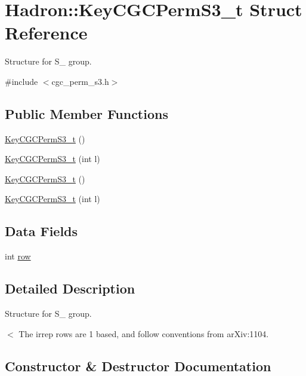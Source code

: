 \hypertarget{structHadron_1_1KeyCGCPermS3__t}{}\section{Hadron\+:\+:Key\+C\+G\+C\+Perm\+S3\+\_\+t Struct Reference}
\label{structHadron_1_1KeyCGCPermS3__t}


Structure for S\+\_ group.  




{\ttfamily \#include $<$cgc\+\_\+perm\+\_\+s3.\+h$>$}

\subsection*{Public Member Functions}
\begin{DoxyCompactItemize}
\item 
\mbox{\hyperlink{structHadron_1_1KeyCGCPermS3__t_a7d9a9f27c0bc478ff41dbdc47deee19e}{Key\+C\+G\+C\+Perm\+S3\+\_\+t}} ()
\item 
\mbox{\hyperlink{structHadron_1_1KeyCGCPermS3__t_af58d8b287b6da4b7998735e67be0f1f9}{Key\+C\+G\+C\+Perm\+S3\+\_\+t}} (int l)
\item 
\mbox{\hyperlink{structHadron_1_1KeyCGCPermS3__t_a7d9a9f27c0bc478ff41dbdc47deee19e}{Key\+C\+G\+C\+Perm\+S3\+\_\+t}} ()
\item 
\mbox{\hyperlink{structHadron_1_1KeyCGCPermS3__t_af58d8b287b6da4b7998735e67be0f1f9}{Key\+C\+G\+C\+Perm\+S3\+\_\+t}} (int l)
\end{DoxyCompactItemize}
\subsection*{Data Fields}
\begin{DoxyCompactItemize}
\item 
int \mbox{\hyperlink{structHadron_1_1KeyCGCPermS3__t_ae42674e0246b466965e187a7210cd8e2}{row}}
\end{DoxyCompactItemize}


\subsection{Detailed Description}
Structure for S\+\_ group. 

$<$ The irrep rows are 1 based, and follow conventions from ar\+Xiv\+:1104. 

\subsection{Constructor \& Destructor Documentation}
\mbox{\label{structHadron_1_1KeyCGCPermS3__t_a7d9a9f27c0bc478ff41dbdc47deee19e}} 
